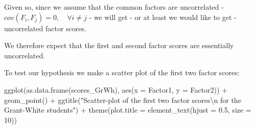 \documentclass[
  letterpaper,
  DIV=11,
  numbers=noendperiod]{scrartcl}
\newenvironment{Shaded}{\begin{snugshade}}{\end{snugshade}}
\newcommand{\AttributeTok}[1]{\textcolor[rgb]{0.40,0.45,0.13}{#1}}
\newcommand{\DecValTok}[1]{\textcolor[rgb]{0.68,0.00,0.00}{#1}}
\newcommand{\FloatTok}[1]{\textcolor[rgb]{0.68,0.00,0.00}{#1}}
\newcommand{\FunctionTok}[1]{\textcolor[rgb]{0.28,0.35,0.67}{#1}}
\newcommand{\NormalTok}[1]{\textcolor[rgb]{0.00,0.23,0.31}{#1}}
\newcommand{\OtherTok}[1]{\textcolor[rgb]{0.00,0.23,0.31}{#1}}
\newcommand{\SpecialCharTok}[1]{\textcolor[rgb]{0.37,0.37,0.37}{#1}}
\newcommand{\StringTok}[1]{\textcolor[rgb]{0.13,0.47,0.30}{#1}}
\begin{document}
Given so, since we assume that the common factors are uncorrelated -
\(cov(F_i, F_j) = 0, \quad \forall i\neq j\) - we will get - or at least
we would like to get - uncorrelated factor scores.

We therefore expect that the first and second factor scores are
essentially uncorrelated.

To test our hypothesis we make a scatter plot of the first two factor
scores:

\begin{Shaded}
\end{Shaded}

\begin{Shaded}
\begin{Highlighting}[]
\FunctionTok{ggplot}\NormalTok{(}\FunctionTok{as.data.frame}\NormalTok{(scores\_GrWh), }\FunctionTok{aes}\NormalTok{(}\AttributeTok{x =}\NormalTok{ Factor1, }\AttributeTok{y =}\NormalTok{ Factor2)) }\SpecialCharTok{+} 
  \FunctionTok{geom\_point}\NormalTok{() }\SpecialCharTok{+}
  \FunctionTok{ggtitle}\NormalTok{(}\StringTok{"Scatter{-}plot of the first two factor scores}\SpecialCharTok{\textbackslash{}n}\StringTok{ for the Grant{-}White students"}\NormalTok{) }\SpecialCharTok{+}
  \FunctionTok{theme}\NormalTok{(}\AttributeTok{plot.title =} \FunctionTok{element\_text}\NormalTok{(}\AttributeTok{hjust =} \FloatTok{0.5}\NormalTok{, }\AttributeTok{size =} \DecValTok{10}\NormalTok{))}
\end{Highlighting}
\end{Shaded}
\end{document}

